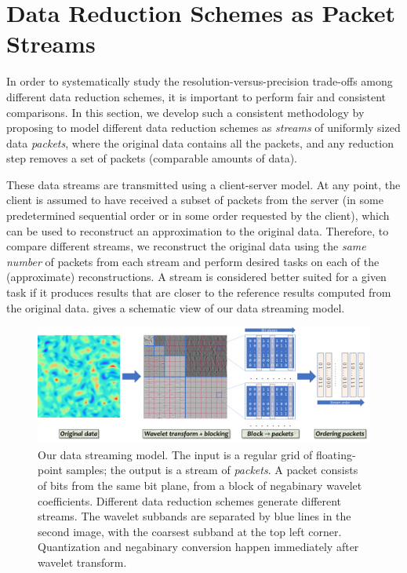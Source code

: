\section{Data Reduction Schemes as Packet Streams}\label{sec:terminologies}

In order to systematically study the resolution-versus-precision trade-offs among different data
reduction schemes, it is important to perform fair and consistent comparisons. In this section, we
develop such a consistent methodology by proposing to model different data reduction schemes as
\emph{streams} of uniformly sized data \emph{packets}, where the original data contains all the
packets, and any reduction step removes a set of packets (comparable amounts of data).

These data streams are transmitted using a client-server model. At any point, the client is assumed
to have received a subset of packets from the server (in some predetermined sequential order or in
some order requested by the client), which can be used to reconstruct an approximation to the
original data. Therefore, to compare different streams, we reconstruct the original data using the
\emph{same number} of packets from each stream and perform desired tasks on each of the
(approximate) reconstructions. A stream is considered better suited for a given task if it produces
results that are closer to the reference results computed from the original data.
 gives a schematic view of our data streaming model.

\begin{figure}[!b]
\vspace{-1em}
\centering
\includegraphics[width=\linewidth]{img/pipeline.png}
\vspace{-1em}
\caption{Our data streaming model. The input is a regular grid of floating-point samples;
the output is a stream of \emph{packets}. A packet consists of bits from the same bit plane, from a
block of negabinary wavelet coefficients. Different data reduction schemes generate different
streams.  The wavelet subbands are separated by blue lines in the second image, with the coarsest
subband at the top left corner. 
Quantization and negabinary conversion
happen immediately after wavelet transform.
}\label{fig:pipeline}
\end{figure}

